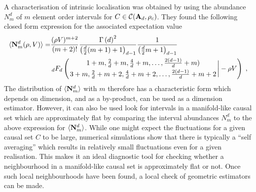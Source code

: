 A characterisation of intrinsic localisation was obtained by \cite{intervals}  using the abundance $N_m^d$ of $m$ element order
intervals for $C\in\mathcal C(\mathbf A_d,\rho_c)$.  They  found the following closed form expression for the associated
expectation value 
\begin{align}
	\av{\bN_m^d(\rho,V)}=& \frac{(\rho V)^{m+2}}{(m+2)!} \frac{\G{d}^{2}}{\Poch{\frac{d}{2} (m + 1) + 1}{d - 1}} \frac{1}{\Poch{\frac{d}{2} m + 1}{d - 1}} \nonumber \\
	& \mFm{d}{1+m,\frac{2 }
	{d}+m,\frac{4}{d}+m, \dots ,\frac{2 (d-1)}{d}+m)}
	{3+m,\frac{2 }{d}+m+2,\frac{4}{d}+m+2, \dots ,\frac{2 (d-1)}{d}+m+2}
	{- \rho V} \;,
\label{eq:flatclosedform} 
\end{align} 
The distribution of $\langle {\mathbf N_m^d} \rangle$ with $m$ therefore has a characteristic form which depends on dimension, and as a by-product,
can be used as a  dimension estimator. However, it can also be used look for intervals in a manifold-like causal set
which are approximately flat by comparing the interval abundances $N_m^d$ to the above expression for $\langle {\mathbf N_m^d} \rangle$.  While one might expect  the fluctuations for a given causal
set $C$ to be  large,  numerical simulations show that there is typically a ``self averaging'' which results in 
 relatively small fluctuations even for a given realisation. This makes it an ideal
diagnostic tool for checking whether a neighbourhood in a manifold-like causal set is approximately flat or not. Once such local
neighbourhoods have  been found, a local check of geometric estimators can be made.

